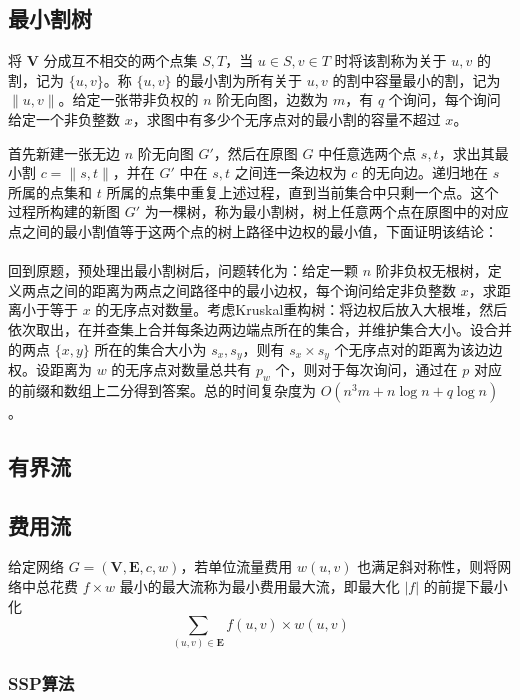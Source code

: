 \documentclass[12pt,a4paper]{article}
\begin{document}
\newpage
\subsection{最小割树}
\begin{mdframed}[leftline=true, linewidth=2pt, linecolor=gray]
	将 $\mathbf{V}$ 分成互不相交的两个点集 $S,T$，当 $u\in S,v\in T$ 时将该割称为关于 $u,v$ 的割，记为 $\{u,v\}$。称 $\{u,v\}$ 的最小割为所有关于 $u,v$ 的割中容量最小的割，记为 $\|u,v\|$。给定一张带非负权的 $n$ 阶无向图，边数为 $m$，有 $q$ 个询问，每个询问给定一个非负整数 $x$，求图中有多少个无序点对的最小割的容量不超过 $x$。
\end{mdframed}
首先新建一张无边 $n$ 阶无向图 $G'$，然后在原图 $G$ 中任意选两个点 $s,t$，求出其最小割 $c=\|s,t\|$，并在 $G'$ 中在 $s,t$ 之间连一条边权为 $c$ 的无向边。递归地在 $s$ 所属的点集和 $t$ 所属的点集中重复上述过程，直到当前集合中只剩一个点。这个过程所构建的新图 $G'$ 为一棵树，称为最小割树，树上任意两个点在原图中的对应点之间的最小割值等于这两个点的树上路径中边权的最小值，下面证明该结论：\\
\\
回到原题，预处理出最小割树后，问题转化为：给定一颗 $n$ 阶非负权无根树，定义两点之间的距离为两点之间路径中的最小边权，每个询问给定非负整数 $x$，求距离小于等于 $x$ 的无序点对数量。考虑Kruskal重构树：将边权后放入大根堆，然后依次取出，在并查集上合并每条边两边端点所在的集合，并维护集合大小。设合并的两点 $\{x,y\}$ 所在的集合大小为 $s_x,s_y$，则有 $s_x\times s_y$ 个无序点对的距离为该边边权。设距离为 $w$ 的无序点对数量总共有 $p_w$ 个，则对于每次询问，通过在 $p$ 对应的前缀和数组上二分得到答案。总的时间复杂度为 $O(n^3m+n\log{n}+q\log{n})$。

\subsection{有界流} %
\subsection{费用流}
\begin{mdframed}[leftline=true, linewidth=2pt, linecolor=gray]
	给定网络 $G=(\mathbf{V},\mathbf{E},c,w)$，若单位流量费用 $w(u,v)$ 也满足斜对称性，则将网络中总花费 $f\times w$ 最小的最大流称为最小费用最大流，即最大化 $|f|$ 的前提下最小化 
	\begin{equation*}
		\sum_{(u,v)\in\mathbf{E}}f(u,v)\times w(u,v)
	\end{equation*}
\end{mdframed}
\subsubsection{SSP算法}
\end{document}
